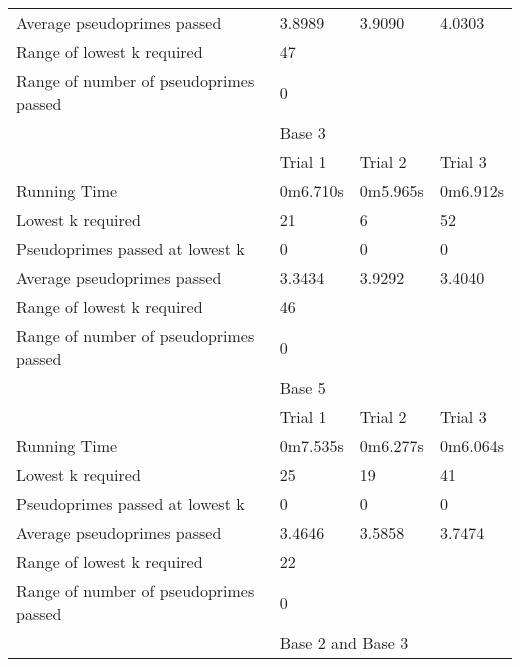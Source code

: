 \documentclass{article}
\begin{document}
\begin{appendices}
\begin{longtable}{llll}
Average pseudoprimes passed            & 3.8989    & 3.9090   & 4.0303          \\
\cmidrule(lr){2-2}\cmidrule(lr){3-3}\cmidrule(lr){4-4}
Range of lowest k required             & \multicolumn{3}{l}{47}                 \\
Range of number of pseudoprimes passed & \multicolumn{3}{l}{0}                  \\
\midrule
                                       & \multicolumn{3}{l}{Base 3}             \\
\midrule
                                       & Trial 1   & Trial 2  & Trial 3         \\
Running Time                           & 0m6.710s  & 0m5.965s & 0m6.912s        \\
Lowest k required                      & 21        & 6        & 52              \\
Pseudoprimes passed at lowest k        & 0         & 0        & 0               \\
Average pseudoprimes passed            & 3.3434    & 3.9292   & 3.4040          \\
\cmidrule(lr){2-2}\cmidrule(lr){3-3}\cmidrule(lr){4-4}
Range of lowest k required             & \multicolumn{3}{l}{46}                 \\
Range of number of pseudoprimes passed & \multicolumn{3}{l}{0}                  \\
\midrule
                                       & \multicolumn{3}{l}{Base 5}             \\
\midrule
                                       & Trial 1   & Trial 2  & Trial 3         \\
Running Time                           & 0m7.535s  & 0m6.277s & 0m6.064s        \\
Lowest k required                      & 25        & 19       & 41              \\
Pseudoprimes passed at lowest k        & 0         & 0        & 0               \\
Average pseudoprimes passed            & 3.4646    & 3.5858   & 3.7474          \\
\cmidrule(lr){2-2}\cmidrule(lr){3-3}\cmidrule(lr){4-4}
Range of lowest k required             & \multicolumn{3}{l}{22}                 \\
Range of number of pseudoprimes passed & \multicolumn{3}{l}{0}                  \\
\midrule
                                       & \multicolumn{3}{l}{Base 2 and Base 3}  \\

\end{longtable}
\end{appendices}
\end{document}
